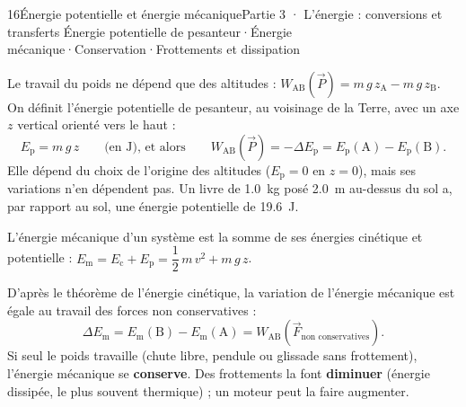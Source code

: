\begin{ouverture}[transferts]{16}{Énergie potentielle et énergie mécanique}{Partie 3 · L'énergie : conversions et transferts}
{Énergie potentielle de pesanteur\enspace·\enspace Énergie mécanique\enspace·\enspace Conservation\enspace·\enspace Frottements et dissipation}
\end{ouverture}
\essentiel
{}
\begin{definition}
Le travail du poids ne dépend que des altitudes : $W_{\mathrm{AB}}(\vec{P})=m\,g\,z_\mathrm{A}-m\,g\,z_\mathrm{B}$. On définit l'énergie potentielle de pesanteur, au
voisinage de la Terre, avec un axe $z$ vertical orienté vers le haut :
\[E_\mathrm{p}=m\,g\,z\qquad\text{(en J), et alors}\qquad W_{\mathrm{AB}}(\vec{P})=-\Delta E_\mathrm{p}=E_\mathrm{p}(\mathrm{A})-E_\mathrm{p}(\mathrm{B}).\]
Elle dépend du choix de l'origine des altitudes ($E_\mathrm{p}=0$ en $z=0$), mais ses variations n'en dépendent pas. Un livre de \qty{1,0}{kg}
posé \qty{2,0}{m} au-dessus du sol a, par rapport au sol, une énergie potentielle de \qty{19,6}{J}.
\end{definition}
\begin{definition}
L'énergie mécanique d'un système est la somme de ses énergies cinétique et potentielle : $E_\mathrm{m}=E_\mathrm{c}+E_\mathrm{p}=\dfrac{1}{2}\,m\,v^2+m\,g\,z$.
\end{definition}
\begin{loi}
D'après le théorème de l'énergie cinétique, la variation de l'énergie mécanique est égale au travail des forces non
conservatives :
\[\Delta E_\mathrm{m}=E_\mathrm{m}(\mathrm{B})-E_\mathrm{m}(\mathrm{A})=W_{\mathrm{AB}}(\vec{F}_\text{non conservatives}).\]
Si seul le poids travaille (chute libre, pendule ou glissade sans frottement), l'énergie mécanique se \textbf{conserve}. Des
frottements la font \textbf{diminuer} (énergie dissipée, le plus souvent thermique) ; un moteur peut la faire augmenter.
\end{loi}
